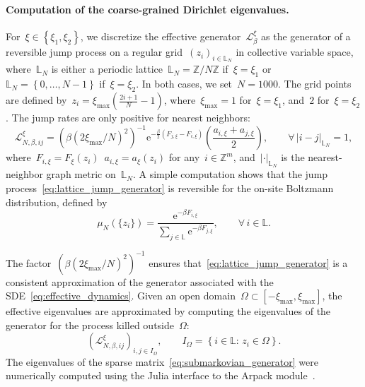 \documentclass[a4]{article}
\newcommand{\cL}{\mathcal{L}}
\newcommand{\e}{\mathrm{e}}
\newcommand{\1}{\mathbbm 1}
\begin{document}
\paragraph{Computation of the coarse-grained Dirichlet eigenvalues.}
For~$\xi\in\left\{\xi_1,\xi_2\right\}$, we discretize the effective generator~$\cL_{\beta}^\xi$ as the generator of a reversible jump process on a regular grid~$(z_i)_{i\in \mathbb L_N}$ in collective variable space, where~$\mathbb L_N$ is either a periodic lattice~$\mathbb{L}_N=\mathbb Z/N\mathbb Z$ if~$\xi=\xi_1$ or~$\mathbb{L}_N=\left\{0,\dots,N-1\right\}$ if~$\xi=\xi_2$.
In both cases, we set~$N=1000$.
The grid points are defined by~$z_i=\xi_{\max}\left(\frac{2i+1}{N}-1\right)$, where~$\xi_{\max}=1$ for~$\xi=\xi_1$, and~$2$ for~$\xi=\xi_2$.
The jump rates are only positive for nearest neighbors:
\begin{equation}
    \label{eq:lattice_jump_generator}
    \cL_{N,\beta,ij}^\xi = \left(\beta(2\xi_{\max}/N)^2\right)^{-1}\e^{-\frac{\beta}2\left(F_{j,\xi}-F_{i,\xi}\right)}\left(\frac{a_{i,\xi}+a_{j,\xi}}{2}\right),\qquad \forall\,|i-j|_{\mathbb{L}_N}=1,
\end{equation}
where~$F_{i,\xi} = F_\xi(z_i)$~$a_{i,\xi}=a_\xi(z_i)$ for any~$i\in \mathbb Z^m$, and~$|\cdot|_{\mathbb L_N}$ is the nearest-neighbor graph metric on~$\mathbb L_N$.
A simple computation shows that the jump process~\eqref{eq:lattice_jump_generator} is reversible for the on-site Boltzmann distribution, defined by
\begin{equation}\mu_{N}\left(\{z_i\}\right) =\frac{\e^{-\beta F_{i,\xi}}}{\sum_{j\in\mathbb L}\e^{-\beta F_{j,\xi}}},\qquad \forall\,i\in\mathbb L.\end{equation}

The factor~$\left(\beta(2\xi_{\max}/N)^2\right)^{-1}$ ensures that~\eqref{eq:lattice_jump_generator} is a consistent approximation of the generator associated with the SDE~\eqref{eq:effective_dynamics}.
Given an open domain~$\Omega\subset[-\xi_{\max},\xi_{\max}]$, the effective eigenvalues are approximated by computing the eigenvalues of the generator for the process killed outside~$\Omega$:
\begin{equation}
    \label{eq:submarkovian_generator}
    \left(\cL_{N,\beta,ij}^\xi\right)_{i,j\in I_{\Omega}},\qquad I_{\Omega}=\left\{i\in\mathbb L:\,z_i\in\Omega\right\}.
\end{equation}
The eigenvalues of the sparse matrix~\eqref{eq:submarkovian_generator} were numerically computed using the Julia interface to the Arpack module~\cite{LSY98}.
\end{document}
